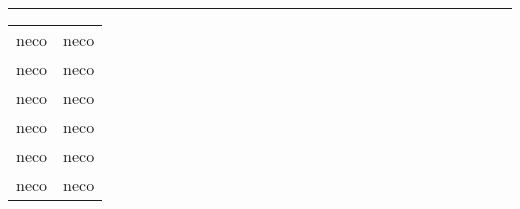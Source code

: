 \begin{titlepage}
  \rule{\textwidth}{1mm}
  \begin{tabular}[T]{| c | c |}
    \toprule
    neco & neco \\
    neco & neco \\
    neco & neco \\
    neco & neco \\
    neco & neco \\
    neco & neco \\
    \bottomrule
  \end{tabular}
\end{titlepage}
